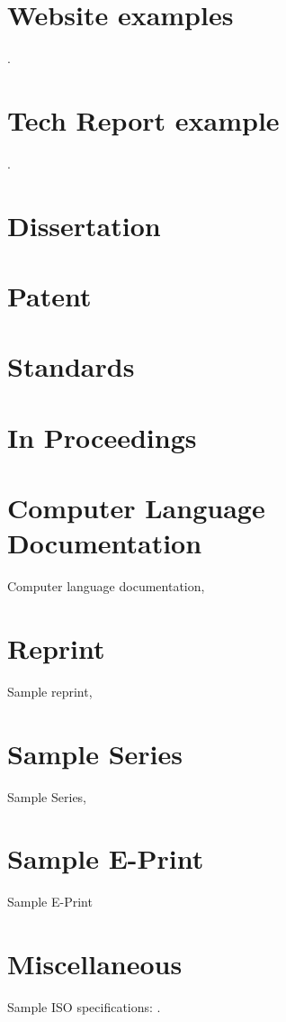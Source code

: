 \documentclass{JASA-EL}
\begin{document}
\citep{translation}


\section*{Website examples}

\citep{websiteauthyear}.

\section*{Tech Report example}

\citep{samptechreport6}.

\section*{Dissertation}
\citep{sampthesis}


\section*{Patent}

\citep{samppatent2}

\section*{Standards}

\citep{amstand,ansi}

\section*{In Proceedings}

\citep{sampinproceedings3}

\section*{Computer Language Documentation}
Computer language documentation, 

\citep{sampcode2}


\section*{Reprint}
Sample reprint, 
\citep{sampReprint}

\section*{Sample Series}
Sample Series, 

\citep{sampSeries}

\section*{Sample E-Print}
 Sample E-Print 
\citep{sampEprint}

\section*{Miscellaneous}
Sample ISO specifications: \citep{sampMisc}.



\end{document}
